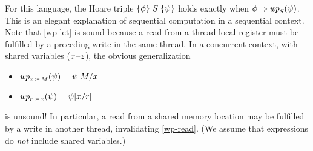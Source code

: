 For this language, the Hoare triple
$\{\phi\}\allowbreak\;S\;\allowbreak\{\psi\}$ holds exactly when $\aForm \limplies
\fwp{\aCmd}{\bForm}$.
This is an elegant explanation of sequential computation in a sequential
context. Note that \ref{wp-let} is sound because a read from a thread-local
register must be fulfilled by a preceding write in the same thread.
In a concurrent context, with shared variables
($x$--$z$), the obvious generalization
\begin{multicols}{2}
\begin{itemize}
\item[{\labeltext[\textsc{d}2b]{(\textsc{d}2b)}{wp-write}}] $\fwp{\LET{\aLoc}{\aExp}}{\bForm} = \bForm[\aExp/\aLoc]$
\item[{\labeltext[\textsc{d}2c]{(\textsc{d}2c)}{wp-read}}] $\fwp{\LET{\aReg}{\aLoc}}{\bForm} = \bForm[\aLoc/\aReg]$
\end{itemize}
\end{multicols}
\noindent
is unsound!  In particular, a read from a shared memory location may be fulfilled by a write
in another thread, invalidating \ref{wp-read}.  (We assume that expressions
do \emph{not} include shared variables.) %

